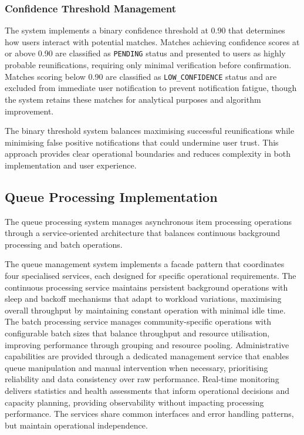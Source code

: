 \subsubsection{Confidence Threshold Management}

The system implements a binary confidence threshold at 0.90 that determines how users interact with potential matches. Matches achieving confidence scores at or above 0.90 are classified as \texttt{PENDING} status and presented to users as highly probable reunifications, requiring only minimal verification before confirmation. Matches scoring below 0.90 are classified as \texttt{LOW\_CONFIDENCE} status and are excluded from immediate user notification to prevent notification fatigue, though the system retains these matches for analytical purposes and algorithm improvement.

The binary threshold system balances maximising successful reunifications while minimising false positive notifications that could undermine user trust. This approach provides clear operational boundaries and reduces complexity in both implementation and user experience.



\subsection{Queue Processing Implementation} \label{subsection:queue_processing}

The queue processing system manages asynchronous item processing operations through a service-oriented architecture that balances continuous background processing and batch operations.

The queue management system implements a facade pattern that coordinates four specialised services, each designed for specific operational requirements. The continuous processing service maintains persistent background operations with sleep and backoff mechanisms that adapt to workload variations, maximising overall throughput by maintaining constant operation with minimal idle time. The batch processing service manages community-specific operations with configurable batch sizes that balance throughput and resource utilisation, improving performance through grouping and resource pooling. Administrative capabilities are provided through a dedicated management service that enables queue manipulation and manual intervention when necessary, prioritising reliability and data consistency over raw performance. Real-time monitoring delivers statistics and health assessments that inform operational decisions and capacity planning, providing observability without impacting processing performance. The services share common interfaces and error handling patterns, but maintain operational independence.

